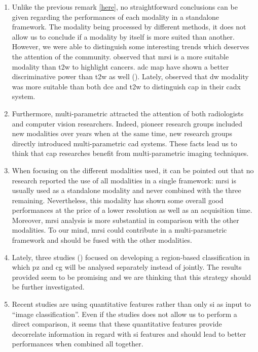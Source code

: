 {\begin{enumerate}
	\item Unlike the previous remark \ref{here}, no straightforward conclusions can be given regarding the performances of each modality in a standalone framework. The modality being processed by different methods, it does not allow us to conclude if a modality by itself is more suited than another. However, we were able to distinguish some interesting trends which deserves the attention of the community. \cite{Tiwari2009a,Tiwari2012,Tiwari2013} observed that \ac{mrsi} is a more suitable modality than \ac{t2w} to highlight cancers. \ac{adc} map have shown a better discriminative power than \ac{t2w} as well (\cite{Langer2009,Viswanath2011,Peng2013}). Lately, \cite{Litjens2014} observed that \ac{dw} modality was more suitable than both \ac{dce} and \ac{t2w} to distinguish \ac{cap} in their \ac{cadx} system. 

	\item Furthermore, multi-parametric attracted the attention of both radiologists and computer vision researchers. Indeed, pioneer research groups included new modalities over years when at the same time, new research groups directly introduced multi-parametric \ac{cad} systems. These facts lead us to think that \ac{cap} researches benefit from multi-parametric imaging techniques.

	\item When focusing on the different modalities used, it can be pointed out that no research reported the use of all modalities in a single framework: \ac{mrsi} is usually used as a standalone modality and never combined with the three remaining. Nevertheless, this modality has shown some overall good performances at the price of a lower resolution as well as an acquisition time. Moreover, \ac{mrsi} analysis is more substantial in comparison with the other modalities. To our mind, \ac{mrsi} could contribute in a multi-parametric framework and should be fused with the other modalities.

	\item Lately, three studies (\cite{Viswanath2012,Litjens2012,Litjens2014}) focused on developing a region-based classification in which \ac{pz} and \ac{cg} will be analysed separately instead of jointly. The results provided seem to be promising and we are thinking that this strategy should be further investigated.
	
	\item Recent studies are using quantitative features rather than only \ac{si} as input to ``image classification''. Even if the studies does not allow us to perform a direct comparison, it seems that these quantitative features provide decorrelate information in regard with \ac{si} features and should lead to better performances when combined all together. 
	

\end{enumerate}}
